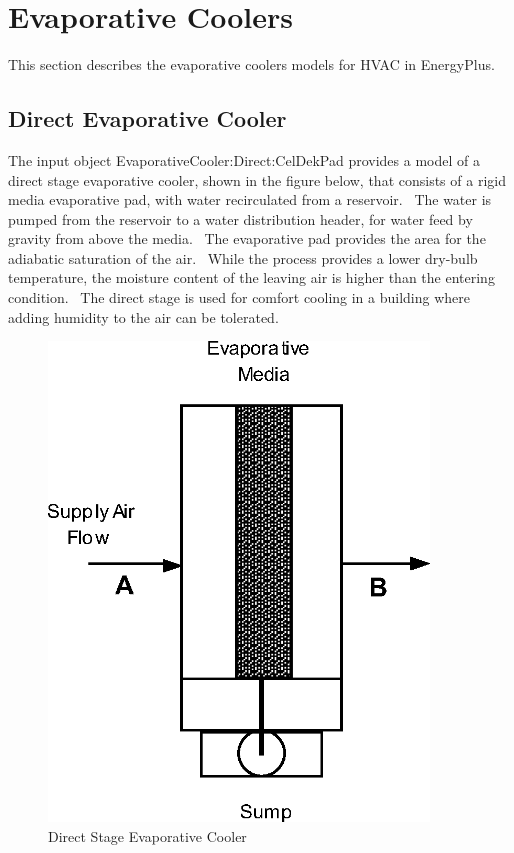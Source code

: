\section{Evaporative Coolers }\label{evaporative-coolers}

This section describes the evaporative coolers models for HVAC in EnergyPlus.

\subsection{Direct Evaporative Cooler}\label{direct-evaporative-cooler}

The input object EvaporativeCooler:Direct:CelDekPad provides a model of a direct stage evaporative cooler, shown in the figure below, that consists of a rigid media evaporative pad, with water recirculated from a reservoir.~ The water is pumped from the reservoir to a water distribution header, for water feed by gravity from above the media.~ The evaporative pad provides the area for the adiabatic saturation of the air.~ While the process provides a lower dry-bulb temperature, the moisture content of the leaving air is higher than the entering condition.~ The direct stage is used for comfort cooling in a building where adding humidity to the air can be tolerated.

\begin{figure}[hbtp] %
\centering
\includegraphics[width=0.9\textwidth, height=0.9\textheight, keepaspectratio=true]{media/image4789.png}
\caption{Direct Stage Evaporative Cooler \protect \label{fig:direct-stage-evaporative-cooler}}
\end{figure}

